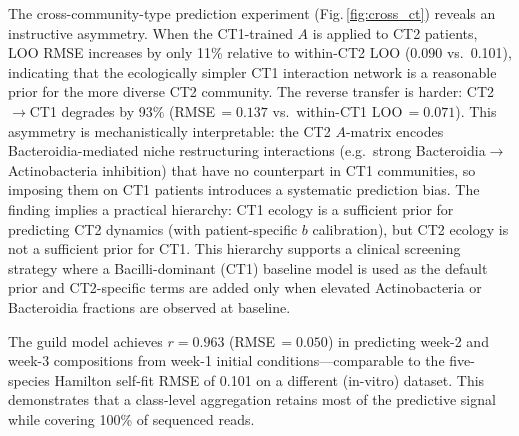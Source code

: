\documentclass[11pt,a4paper]{article}
\begin{document}
The cross-community-type prediction experiment (Fig.\,\ref{fig:cross_ct}) reveals an instructive asymmetry.
When the CT1-trained $A$ is applied to CT2 patients, LOO RMSE increases by only 11\% relative to within-CT2 LOO (0.090 vs.\ 0.101), indicating that the ecologically simpler CT1 interaction network is a reasonable prior for the more diverse CT2 community.
The reverse transfer is harder: CT2$\to$CT1 degrades by 93\% (RMSE\,$=0.137$ vs.\ within-CT1 LOO\,$=0.071$).
This asymmetry is mechanistically interpretable: the CT2 $A$-matrix encodes Bacteroidia-mediated niche restructuring interactions (e.g.\ strong Bacteroidia$\to$Actinobacteria inhibition) that have no counterpart in CT1 communities, so imposing them on CT1 patients introduces a systematic prediction bias.
The finding implies a practical hierarchy: CT1 ecology is a sufficient prior for predicting CT2 dynamics (with patient-specific $b$ calibration), but CT2 ecology is not a sufficient prior for CT1.
This hierarchy supports a clinical screening strategy where a Bacilli-dominant (CT1) baseline model is used as the default prior and CT2-specific terms are added only when elevated Actinobacteria or Bacteroidia fractions are observed at baseline.

The guild model achieves $r=0.963$ (RMSE\,$=0.050$) in predicting week-2 and week-3 compositions from week-1 initial conditions---comparable to the five-species Hamilton self-fit RMSE of 0.101 on a different (in-vitro) dataset.
This demonstrates that a class-level aggregation retains most of the predictive signal while covering 100\% of sequenced reads.
\end{document}

